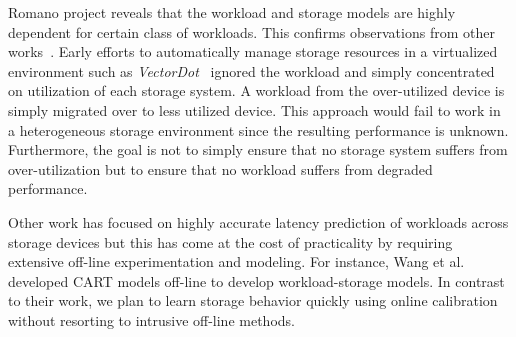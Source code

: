 Romano\cite{romano} project reveals that the workload and storage models are highly dependent for certain class of workloads. 
This confirms observations from other works~\cite{relative-fitness, benchmark}.  
Early efforts to automatically manage storage resources in a virtualized environment such as \emph{VectorDot}~\cite{vectordot} ignored the workload and simply concentrated on utilization of each storage system. 
A workload from the over-utilized device is simply migrated over to less utilized device. 
This approach would fail to work in a heterogeneous storage environment since the resulting performance is unknown.
Furthermore, the goal is not to simply ensure that no storage system suffers from over-utilization but to ensure that no workload suffers from degraded performance. 

Other work has focused on highly accurate latency prediction of workloads across storage devices but this has come at the cost of practicality by requiring extensive off-line experimentation and modeling. 
For instance, Wang et al.~\cite{relative-fitness} developed CART models off-line to develop workload-storage models. 
In contrast to their work, we plan to learn storage behavior quickly using online calibration without resorting to intrusive off-line methods.

